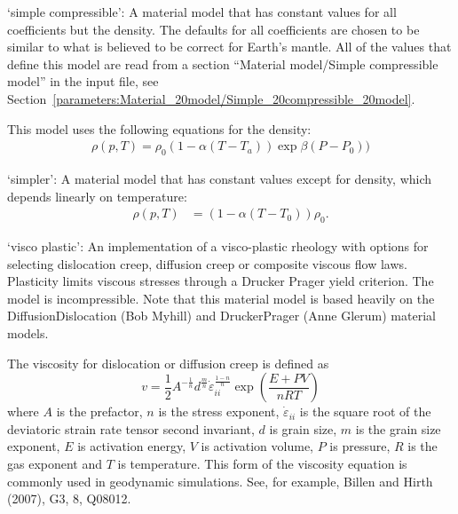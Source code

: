 \begin{itemize}

`simple compressible': A material model that has constant values for all coefficients but the density. The defaults for all coefficients are chosen to be similar to what is believed to be correct for Earth's mantle. All of the values that define this model are read from a section ``Material model/Simple compressible model'' in the input file, see Section~\ref{parameters:Material_20model/Simple_20compressible_20model}.

This model uses the following equations for the density: \begin{align}  \rho(p,T) = \rho_0              \left(1-\alpha (T-T_a)\right)               \exp{\beta (P-P_0))}\end{align}

`simpler': A material model that has constant values except for density, which depends linearly on temperature: \begin{align}  \rho(p,T) &= \left(1-\alpha (T-T_0)\right)\rho_0.\end{align}


`visco plastic': An implementation of a visco-plastic rheology with options for selecting dislocation creep, diffusion creep or composite viscous flow laws.  Plasticity limits viscous stresses through a Drucker Prager yield criterion. The model is incompressible. Note that this material model is based heavily on the DiffusionDislocation (Bob Myhill) and DruckerPrager (Anne Glerum) material models. 

 The viscosity for dislocation or diffusion creep is defined as \[v = \frac 12 A^{-\frac{1}{n}} d^{\frac{m}{n}} \dot{\varepsilon}_{ii}^{\frac{1-n}{n}} \exp\left(\frac{E + PV}{nRT}\right)\] where $A$ is the prefactor, $n$ is the stress exponent, $\dot{\varepsilon}_{ii}$ is the square root of the deviatoric strain rate tensor second invariant, $d$ is grain size, $m$ is the grain size exponent, $E$ is activation energy, $V$ is activation volume, $P$ is pressure, $R$ is the gas exponent and $T$ is temperature. This form of the viscosity equation is commonly used in geodynamic simulations.  See, for example, Billen and Hirth (2007), G3, 8, Q08012.


\end{itemize}
